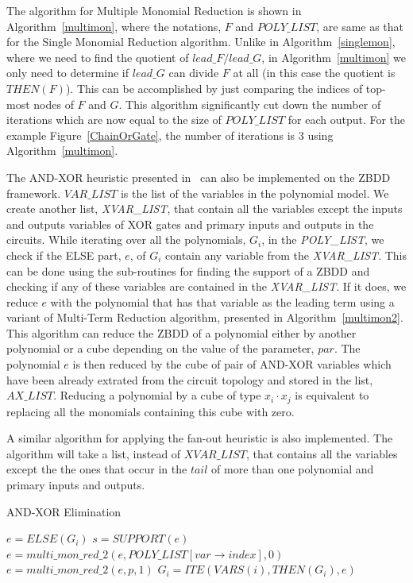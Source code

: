 \documentclass{article}
\theoremstyle{definition}
\begin{document}
The algorithm for Multiple Monomial Reduction is shown in Algorithm~\ref{multimon}, where the notations, $F$ and $POLY\_LIST$, are same as that for the Single Monomial Reduction algorithm. Unlike in Algorithm~\ref{singlemon}, where we need to find the quotient of $lead\_F/lead\_G$, in Algorithm~\ref{multimon} we only need to determine if $lead\_G$ can divide $F$ at all (in this case the quotient is $THEN(F)$). This can be accomplished by just comparing the indices of top-most nodes of $F$ and $G$. This algorithm significantly cut down the number of iterations which are now equal to the size of $POLY\_LIST$ for each output. For the example Figure~\ref{ChainOrGate}, the number of iterations is 3 using Algorithm~\ref{multimon}.

The AND-XOR heuristic presented in~\cite{rolf:2016} can also be implemented on the ZBDD framework. $VAR\_LIST$ is the list of the variables in the polynomial model. We create another list, \textit{XVAR\_LIST}, that contain all the variables except the inputs and outputs variables of XOR gates and primary inputs and outputs in the circuits. While iterating over all the polynomials, $G_i$, in the \textit{POLY\_LIST}, we check if the ELSE part, $e$, of $G_i$ contain any variable from the \textit{XVAR\_LIST}. This can be done using the sub-routines for finding the support of a ZBDD and checking if any of these variables are contained in the \textit{XVAR\_LIST}. If it does, we reduce $e$ with the polynomial that has that variable as the leading term using a variant of Multi-Term Reduction algorithm, presented in Algorithm~\ref{multimon2}. This algorithm can reduce the ZBDD of a polynomial either by another polynomial or a cube depending on the value of the parameter, $par$. The polynomial $e$ is then reduced by the cube of pair of AND-XOR variables which have been already extrated from the circuit topology and stored in the list, $AX\_LIST$. Reducing a polynomial by a cube of type $x_i \cdot x_j$ is equivalent to replacing all the monomials containing this cube with zero. 
\par A similar algorithm for applying the fan-out heuristic is also implemented. The algorithm will take a list, instead of $XVAR\_LIST$, that contains all the variables except the the ones that occur in the $tail$ of more than one polynomial and primary inputs and outputs.

\begin{algorithm}
\caption{AND-XOR Elimination}
\label{and-xor}
\begin{algorithmic}[1]
\State $e = ELSE(G_i)$
\State $s = SUPPORT(e)$
\State $e = multi\_mon\_red\_2(e,POLY\_LIST[var \rightarrow index],0)$
\State $e = multi\_mon\_red\_2(e,p,1)$
\EndFor
\EndIf
\EndFor
\State $G_i = ITE(VARS(i),THEN(G_i),e)$
\EndFor
\EndProcedure
\end{algorithmic}
\end{algorithm}
\end{document}
